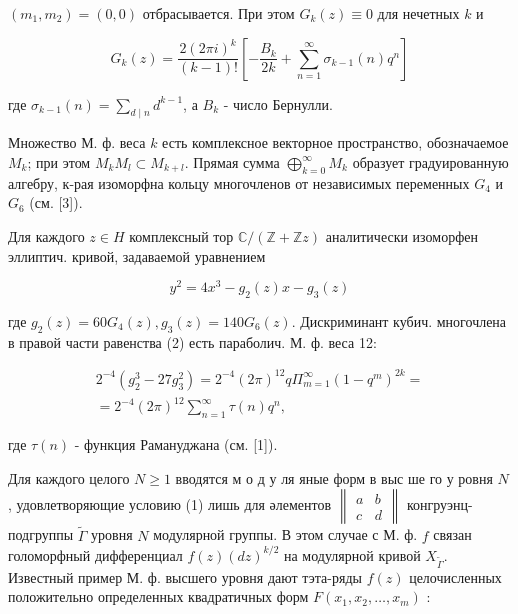 \documentclass[10pt]{article}
\begin{document}
$\left(m_{1}, m_{2}\right)=(0,0)$ отбрасывается. При этом $G_{k}(z) \equiv 0$ для нечетных $k$ и



\[

G_{k}(z)=\frac{2(2 \pi i)^{k}}{(k-1) !}\left[-\frac{B_{k}}{2 k}+\sum_{n=1}^{\infty} \sigma_{k-1}(n) q^{n}\right]

\]



где $\sigma_{k-1}(n)=\sum_{d \mid n} d^{k-1}$, а $B_{k}$ - число Бернулли.



Множество М. ф. веса $k$ есть комплексное векторное пространство, обозначаемое $M_{k}$; при этом $M_{k} M_{l} \subset M_{k+l}$. Прямая сумма $\bigoplus_{k=0}^{\infty} M_{k}$ образует градуированную алгебру, к-рая изоморфна кольцу многочленов от независимых переменных $G_{4}$ и $G_{6}$ (см. [3]).



Для каждого $z \in H$ комплексный тор $\mathbb{C} /(\mathbb{Z}+\mathbb{Z} z)$ аналитически изоморфен эллиптич. кривой, задаваемой уравнением



\[

y^{2}=4 x^{3}-g_{2}(z) x-g_{3}(z)

\]



где $g_{2}(z)=60 G_{4}(z), g_{3}(z)=140 G_{6}(z)$. Дискриминант кубич. многочлена в правой части равенства (2) есть параболич. М. ф. веса 12:



\[

\begin{gathered}

2^{-4}\left(g_{2}^{3}-27 g_{3}^{2}\right)=2^{-4}(2 \pi)^{12} q \Pi_{m=1}^{\infty}\left(1-q^{m}\right)^{2 k}= \\

=2^{-4}(2 \pi)^{12} \sum_{n=1}^{\infty} \tau(n) q^{n},

\end{gathered}

\]



где $\tau(n)$ - функция Рамануджана (см. [1]).



Для каждого целого $N \geqslant 1$ вводятся м о д у ля яные форм в выс ше го у ровня $N$, удовлетворяющие условию (1) лишь для әлементов $\left\|\begin{array}{ll}a & b \\ c & d\end{array}\right\|$ конгруэнц-подгруппы $\tilde{\Gamma}$ уровня $N$ модулярной группы. В этом случае с М. ф. $f$ связан голоморфный дифференциал $f(z)(d z)^{k / 2}$ на модулярной кривой $X_{\tilde{\Gamma}}$. Известный пример М. ф. высшего уровня дают тэта-ряды $f(z)$ целочисленных положительно определенных квадратичных форм $F\left(x_{1}, x_{2}, \ldots, x_{m}\right)$ :
\end{document}
